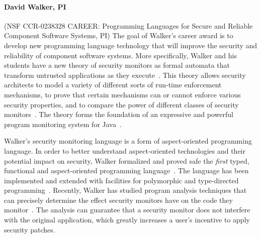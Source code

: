 \documentclass[10pt]{article}
\begin{document}
\paragraph*{David Walker, PI} (NSF CCR-0238328 CAREER: Programming Languages for Secure and Reliable Component Software
Systems, PI)
The goal of Walker's career award is to develop new programming language
technology that will improve the security and reliability of 
component software systems.  More specifically, Walker and his students have 
a new theory of security monitors as formal
automata that transform untrusted applications as they 
execute~\cite{ligatti+:edit-automata}.
This theory allows security
architects to model a variety of different sorts of run-time
enforcement mechanisms, to prove that certain mechanisms can or cannot
enforce various security properties, and to compare the power of
different classes of security monitors~\cite{ligatti+:renewal}.
The theory forms the foundation of an expressive and powerful
program monitoring system for Java~\cite{bauer+:polymer}.

Walker's security monitoring language is a form of 
aspect-oriented programming language.
In order to better understand aspect-oriented technologies and their
potential impact on security, Walker formalized and proved
safe the {\em first} typed, functional and 
aspect-oriented programming language~\cite{walker+:aspects}.
The language has been implemented and
extended with facilities for polymorphic
and type-directed programming~\cite{dantas+:polyaml}.  
Recently, Walker has studied program analysis techniques
that can precisely determine the effect security monitors have on
the code they monitor~\cite{dantas+:harmless-advice,dantas+:harmless-popl}.   
The analysis
can guarantee that a security monitor does not interfere with the 
original application, which greatly increases a user's incentive
to apply security patches.

\end{document}
